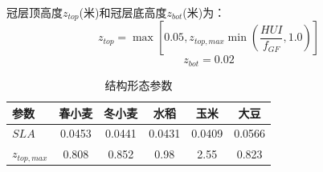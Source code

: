 冠层顶高度$z_{top}$(米)和冠层底高度$z_{bot}$(米)为：
\begin{equation}
z_{top}=\max \left[0.05, z_{top,max} \min \left(\frac{HUI}{f_{GF}}, 1.0\right)\right]
\end{equation}
\begin{equation}
z_{b o t}=0.02
\end{equation}

\begin{table}[htbp]
  \centering
  \caption{结构形态参数}
  \label{tab:结构形态参数}
  \begin{tabular}{@{}lccccc}
  \toprule
  参数   & 春小麦  & 冬小麦 & 水稻    & 玉米   & 大豆    \\ \midrule
  $SLA$  & 0.0453 & 0.0441 & 0.0431 & 0.0409 & 0.0566 \\
  $z_{top,max}$ & 0.808 & 0.852 & 0.98 & 2.55 & 0.823     \\ \bottomrule
  \end{tabular}
\end{table}

